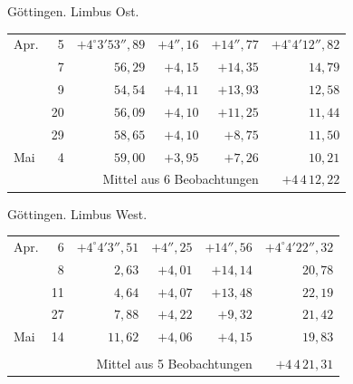 \noindent\begin{minipage}[t]{.495\textwidth}\centering Göttingen. Limbus Ost.\par\smallskip
{\scriptsize\setlength{\tabcolsep}{1pt}\renewcommand{\arraystretch}{1.2}\begin{tabular}{lr|r|r|r|r|}
Apr.&5&$+4^\circ3'53''{,}89$&$+4''{,}16$&$+14''{,}77$&$+4^\circ4'12''{,}82$\\
&7&$56{,}29$&$+4{,}15$&$+14{,}35$&$14{,}79$\\
&9&$54{,}54$&$+4{,}11$&$+13{,}93$&$12{,}58$\\
&20&$56{,}09$&$+4{,}10$&$+11{,}25$&$11{,}44$\\
&29&$58{,}65$&$+4{,}10$&$+8{,}75$&$11{,}50$\\
Mai&4&$59{,}00$&$+3{,}95$&$+7{,}26$&$10{,}21$\\
\cline{6-6}\multicolumn{5}{r}{Mittel aus 6 Beobachtungen}&$+4\,4\,12{,}22$
\end{tabular}}\end{minipage}\hfill\begin{minipage}[t]{.495\textwidth}\centering Göttingen. Limbus West.\par\smallskip
{\scriptsize\setlength{\tabcolsep}{1pt}\renewcommand{\arraystretch}{1.2}\begin{tabular}{lr|r|r|r|r}
Apr.&6&$+4^\circ4'3''{,}51$&$+4''{,}25$&$+14''{,}56$&$+4^\circ4'22''{,}32$\\
&8&$2{,}63$&$+4{,}01$&$+14{,}14$&$20{,}78$\\
&11&$4{,}64$&$+4{,}07$&$+13{,}48$&$22{,}19$\\
&27&$7{,}88$&$+4{,}22$&$+9{,}32$&$21{,}42$\\
Mai&14&$11{,}62$&$+4{,}06$&$+4{,}15$&$19{,}83$\\
&&&&&\\
\cline{6-6}\multicolumn{5}{r}{Mittel aus 5 Beobachtungen}&$+4\,4\,21{,}31$
\end{tabular}}\end{minipage}
\par\vspace{4mm}

